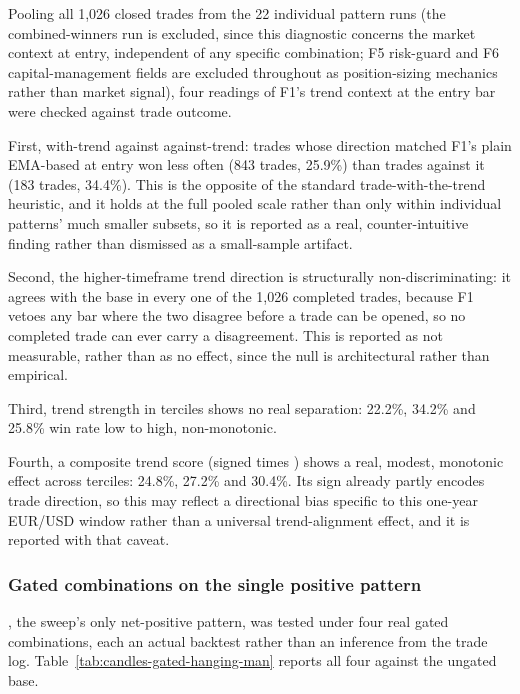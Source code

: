 Pooling all 1,026 closed trades from the 22 individual pattern runs (the combined-winners run is excluded, since this diagnostic concerns the market context at entry, independent of any specific combination; F5 risk-guard and F6 capital-management fields are excluded throughout as position-sizing mechanics rather than market signal), four readings of F1's trend context at the entry bar were checked against trade outcome.

First, with-trend against against-trend: trades whose direction matched F1's plain EMA-based  at entry won less often (843 trades, 25.9\%) than trades against it (183 trades, 34.4\%). This is the opposite of the standard trade-with-the-trend heuristic, and it holds at the full pooled scale rather than only within individual patterns' much smaller subsets, so it is reported as a real, counter-intuitive finding rather than dismissed as a small-sample artifact.

Second, the higher-timeframe trend direction is structurally non-discriminating: it agrees with the base  in every one of the 1,026 completed trades, because F1 vetoes any bar where the two disagree before a trade can be opened, so no completed trade can ever carry a disagreement. This is reported as not measurable, rather than as no effect, since the null is architectural rather than empirical.

Third, trend strength in terciles shows no real separation: 22.2\%, 34.2\% and 25.8\% win rate low to high, non-monotonic.

Fourth, a composite trend score (signed  times ) shows a real, modest, monotonic effect across terciles: 24.8\%, 27.2\% and 30.4\%. Its sign already partly encodes trade direction, so this may reflect a directional bias specific to this one-year EUR/USD window rather than a universal trend-alignment effect, and it is reported with that caveat.

\subsubsection{Gated combinations on the single positive pattern} \label{subsec:candles-gated-hanging-man}

, the sweep's only net-positive pattern, was tested under four real gated combinations, each an actual backtest rather than an inference from the trade log. Table~\ref{tab:candles-gated-hanging-man} reports all four against the ungated base.

